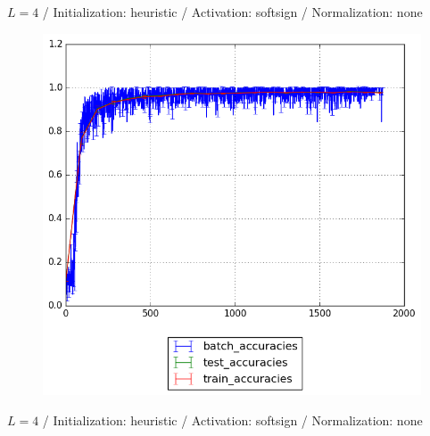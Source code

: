 \documentclass{beamer}
\begin{document}
{	%
	\begin{frame}[t]{}{}%
		\vfill
		\begin{center}
			{$L = 4$ / Initialization: heuristic / Activation: softsign / Normalization: none}
		\end{center}
    		\begin{figure}
    			\centering
    			\includegraphics[scale=0.4]{gfx/l4b32_softsign_heuristic_identity_cnn_accuracies}
    		\end{figure}
    		\vfill
	\end{frame}
	\begin{frame}[t]{}{}%
		\vfill
		\begin{center}
			{$L = 4$ / Initialization: heuristic / Activation: softsign / Normalization: none}
		\end{center}
    		\begin{figure}
    			\centering

\end{figure}
\end{frame}}
\end{document}
